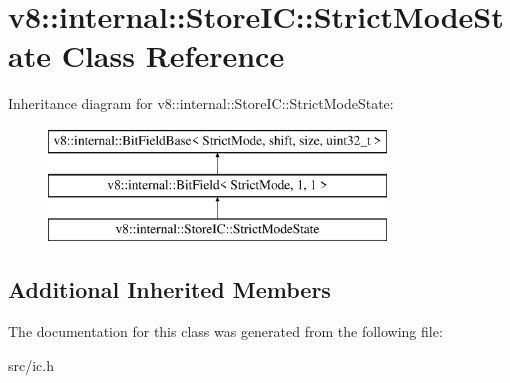 \hypertarget{classv8_1_1internal_1_1_store_i_c_1_1_strict_mode_state}{}\section{v8\+:\+:internal\+:\+:Store\+I\+C\+:\+:Strict\+Mode\+State Class Reference}
\label{classv8_1_1internal_1_1_store_i_c_1_1_strict_mode_state}
Inheritance diagram for v8\+:\+:internal\+:\+:Store\+I\+C\+:\+:Strict\+Mode\+State\+:\begin{figure}[H]
\begin{center}
\leavevmode
\includegraphics[height=3.000000cm]{classv8_1_1internal_1_1_store_i_c_1_1_strict_mode_state}
\end{center}
\end{figure}
\subsection*{Additional Inherited Members}


The documentation for this class was generated from the following file\+:\begin{DoxyCompactItemize}
\item 
src/ic.\+h\end{DoxyCompactItemize}
